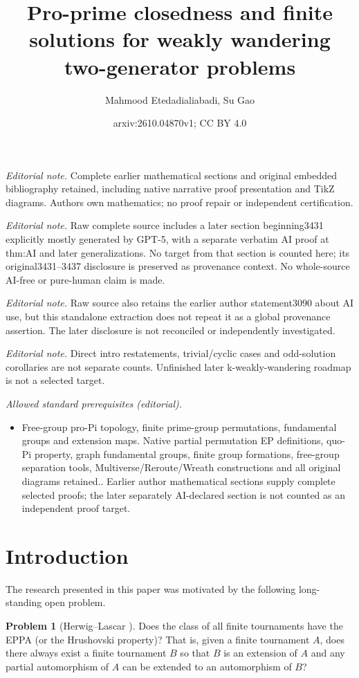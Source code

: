 \documentclass[10pt,a4paper]{amsart}
\title{Pro-prime closedness and finite solutions for weakly wandering two-generator problems}
\author{Mahmood Etedadialiabadi, Su Gao}
\date{arxiv:2610.04870v1; CC BY 4.0}
\theoremstyle{definition}
\newtheorem{problem}[theorem]{Problem}
\theoremstyle{definition}
\numberwithin{equation}{section}
\begin{document}
\maketitle
\noindent\textit{Editorial note.} Complete earlier mathematical sections and original embedded bibliography retained, including native narrative proof presentation and TikZ diagrams. Authors own mathematics; no proof repair or independent certification.\par\medskip
\noindent\textit{Editorial note.} Raw complete source includes a later section beginning3431 explicitly mostly generated by GPT-5, with a separate verbatim AI proof at thm:AI and later generalizations. No target from that section is counted here; its original3431--3437 disclosure is preserved as provenance context. No whole-source AI-free or pure-human claim is made.\par\medskip
\noindent\textit{Editorial note.} Raw source also retains the earlier author statement3090 about AI use, but this standalone extraction does not repeat it as a global provenance assertion. The later disclosure is not reconciled or independently investigated.\par\medskip
\noindent\textit{Editorial note.} Direct intro restatements, trivial/cyclic cases and odd-solution corollaries are not separate counts. Unfinished later k-weakly-wandering roadmap is not a selected target.\par\medskip
\noindent\textit{Allowed standard prerequisites (editorial).}\begin{itemize}
\item Free-group pro-Pi topology, finite prime-group permutations, fundamental groups and extension maps. Native partial permutation EP definitions, quo-Pi property, graph fundamental groups, finite group formations, free-group separation tools, Multiverse/Reroute/Wreath constructions and all original diagrams retained.. Earlier author mathematical sections supply complete selected proofs; the later separately AI-declared section is not counted as an independent proof target.
\end{itemize}\medskip
\section{Introduction}

The research presented in this paper was motivated by the following long-standing open problem.


\begin{problem} [Herwig--Lascar \cite{HL00}]\label{prob:1.1} Does the class of all finite tournaments have the EPPA (or the Hrushovski property)? That is, given a finite tournament $A$, does there always exist a finite tournament $B$ so that $B$ is an extension of $A$ and any partial automorphism of $A$ can be extended to an automorphism of $B$?
\end{problem}
\end{document}
